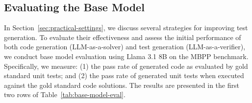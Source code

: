 \subsection{Evaluating the Base Model}
\label{sec:base-performance}
In Section~\ref{sec:practical-settings}, we discuss several strategies for improving test generation. To evaluate their effectiveness and assess the initial performance of both code generation (LLM-as-a-solver) and test generation (LLM-as-a-verifier), we conduct base model evaluation using Llama 3.1 8B on the MBPP benchmark. Specifically, we measure: (1) the pass rate of generated code as evaluated by gold standard unit tests; and (2) the pass rate of generated unit tests when executed against the gold standard code solutions. The results are presented in the first two rows of Table~\ref{tab:base-model-eval}.

\begin{table}[t]
\caption{Code generation and test generation performance for Llama 3.1 8B on the MBPP benchmark. The case pass rate represents the average pass rate per test set. CoT means Chain-of-Thought reasoning, and MV means majority voting.}
\vspace{-0.5em}
\begin{center}
\end{center}
\label{tab:base-model-eval}
\end{table}


